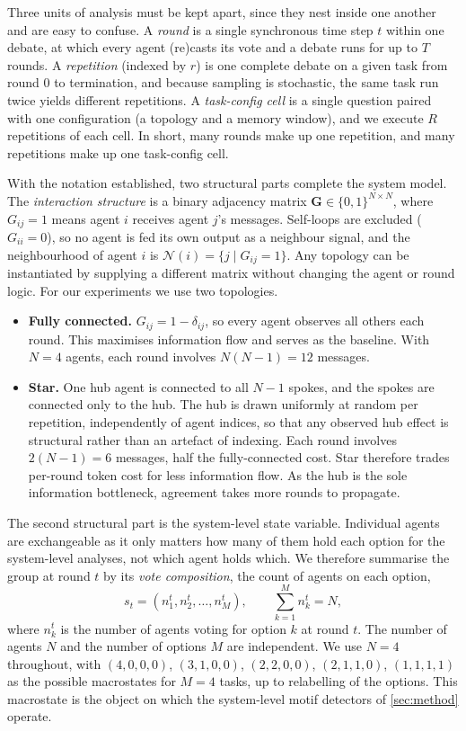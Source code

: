 Three units of analysis must be kept apart, since they nest inside one another
and are easy to confuse. A \emph{round} is a single synchronous time step $t$
within one debate, at which every agent (re)casts its vote and a debate runs for up
to $T$ rounds. A \emph{repetition} (indexed by $r$) is one complete debate on a
given task from round $0$ to termination, and because sampling is stochastic, the
same task run twice yields different repetitions. A \emph{task-config cell} is a
single question paired with one configuration (a topology and a memory window),
and we execute $R$ repetitions of each cell. In short, many rounds make up one
repetition, and many repetitions make up one task-config cell.

With the notation established, two structural parts complete the system model.
The \emph{interaction structure} is a binary adjacency matrix
$\mathbf{G} \in \{0,1\}^{N \times N}$, where $G_{ij}=1$ means agent $i$ receives
agent $j$'s messages. Self-loops are excluded ($G_{ii}=0$), so no agent is fed
its own output as a neighbour signal, and the neighbourhood of agent $i$ is
$\mathcal{N}(i) = \{j \mid G_{ij}=1\}$. Any topology can be instantiated by
supplying a different matrix without changing the agent or round logic. For our 
experiments we use two topologies.
\begin{itemize}
  \item \textbf{Fully connected.} $G_{ij} = 1 - \delta_{ij}$, so every agent
        observes all others each round. This maximises information flow and
        serves as the baseline. With $N = 4$ agents, each round involves
        $N(N-1) = 12$ messages.
  \item \textbf{Star.} One hub agent is connected to all $N-1$ spokes, and the
        spokes are connected only to the hub. The hub is drawn uniformly at
        random per repetition, independently of agent indices, so that any
        observed hub effect is structural rather than an artefact of indexing.
        Each round involves $2(N-1) = 6$ messages, half the fully-connected cost.
        Star therefore trades per-round token cost for less information flow. As the hub
        is the sole information bottleneck, agreement takes more rounds
        to propagate.
\end{itemize}

The second structural part is the system-level state variable.
Individual agents are exchangeable as it only matters how many of them hold each 
option for the system-level analyses, not which agent holds which. We therefore
summarise the group at round $t$ by its \emph{vote composition}, the count of
agents on each option,
\begin{equation}
  s_t = (n_1^{t}, n_2^{t}, \ldots, n_M^{t}),
  \qquad \sum_{k=1}^{M} n_k^{t} = N,
  \label{eq:macrostate}
\end{equation}
where $n_k^{t}$ is the number of agents voting for option $k$ at round $t$. The
number of agents $N$ and the number of options $M$ are independent. We use $N = 4$ throughout, with $(4,0,0,0)$, $(3,1,0,0)$, $(2,2,0,0)$,
$(2,1,1,0)$, $(1,1,1,1)$ as the possible macrostates for $M = 4$ tasks, up to relabelling of the options. This macrostate is the object on which the
system-level motif detectors of \autoref{sec:method} operate.

